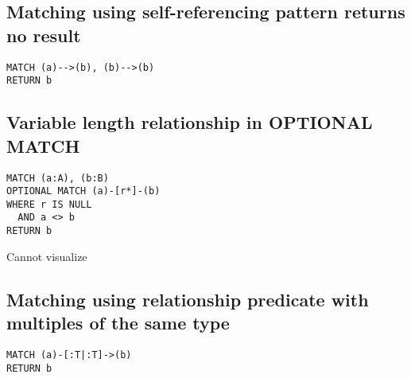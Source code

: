 \subsection{Matching using self-referencing pattern returns no result}

\begin{lstlisting}
MATCH (a)-->(b), (b)-->(b)
RETURN b
\end{lstlisting}

\subsection{Variable length relationship in OPTIONAL MATCH}

\begin{lstlisting}
MATCH (a:A), (b:B)
OPTIONAL MATCH (a)-[r*]-(b)
WHERE r IS NULL
  AND a <> b
RETURN b
\end{lstlisting}

Cannot visualize
\subsection{Matching using relationship predicate with multiples of the same type}

\begin{lstlisting}
MATCH (a)-[:T|:T]->(b)
RETURN b
\end{lstlisting}


